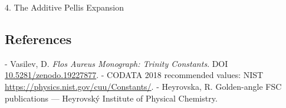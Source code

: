   4. The Additive Pellis Expansion

\subsection{References}

- Vasilev, D. \textit{Flos Aureus Monograph: Trinity Constants}. DOI \href{https://zenodo.org/doi/10.5281/zenodo.19227877}{10.5281/zenodo.19227877}.
- CODATA 2018 recommended values: NIST \href{https://physics.nist.gov/cuu/Constants/}{https://physics.nist.gov/cuu/Constants/}.
- Heyrovska, R. Golden-angle FSC publications --- Heyrovský Institute of Physical Chemistry.
